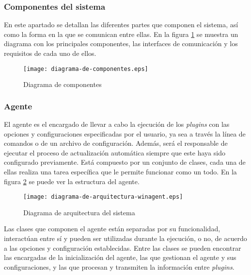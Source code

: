        \subsubsection{Componentes del sistema}
            En este apartado se detallan las diferentes partes que componen el sistema, así como la forma en la que se comunican entre ellas. En la figura \ref{fig:diagrama-de-componentes} se muestra un diagrama con los principales componentes, las interfaces de comunicación y los requisitos de cada uno de ellos.

            \begin{figure}[H]
            \centering
                \texttt{[image: diagrama-de-componentes.eps]}
                \caption{Diagrama de componentes}
                \label{fig:diagrama-de-componentes}
            \end{figure}

        \subsubsection{Agente}
            El agente es el encargado de llevar a cabo la ejecución de los \textit{plugins} con las opciones y configuraciones especificadas por el usuario, ya sea a través la línea de comandos o de un archivo de configuración. Además, será el responsable de ejecutar el proceso de actualización automática siempre que este haya sido configurado previamente. Está compuesto por un conjunto de clases, cada una de ellas realiza una tarea específica que le permite funcionar como un todo. En la figura \ref{fig:diagrama-de-arquitectura-winagent} se puede ver la estructura del agente.
            
            \begin{figure}[h!]
            \centering
                \texttt{[image: diagrama-de-arquitectura-winagent.eps]}
                \caption{Diagrama de arquitectura del sistema}
                \label{fig:diagrama-de-arquitectura-winagent}
            \end{figure}

            Las clases que componen el agente están separadas por su funcionalidad, interactúan entre sí y pueden ser utilizadas durante la ejecución, o no, de acuerdo a las opciones y configuración establecidas. Entre las clases se pueden encontrar las encargadas de la inicialización del agente, las que gestionan el agente y sus configuraciones, y las que procesan y transmiten la información entre \textit{plugins}.
            
